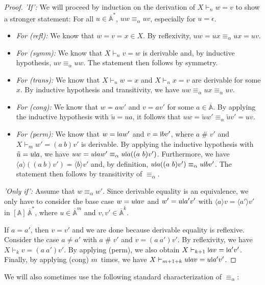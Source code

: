 \documentclass[11pt,a4paper]{amsart}
\newcommand{\Names}{\mathbb{A}}
\newcommand{\barNames}{\overline{\Names}}
\newcommand{\alphaeq}{\equiv_\alpha}
\newcommand{\fresh}{\mathbin{\#}}
\newcommand{\bind}[1]{\langle #1\rangle}
\theoremstyle{plain}
\newcommand{\midmid}{\hspace{0.2ex}{\rule[-0.1ex]{0.6pt}{1.65ex}}\hspace{0.2ex}}
\newcommand{\newletter}[1]{{\midmid}#1}
\numberwithin{equation}{section}
\newcommand{\+}[1]{\mathcal{#1}\xspace}
\theoremstyle{definition}
\begin{document}
\begin{proof}
  \emph{'If':}
  We will proceed by induction on the derivation of \(X \vdash_n w = v\) to show a stronger statement:
  For all \(u\in \barNames^*\), \(uw \alphaeq uv\), especially for \(u = \epsilon\).
  \begin{itemize}
  \item \emph{For (refl):}
    We know that \(w = v = x \in X\).
    By reflexivity, \(uw = ux \alphaeq ux = uv\).
  \item \emph{For (symm):}
    We know that \(X \vdash_n v = w\) is derivable and, by inductive hypothesis, \(uv \alphaeq uw\).
    The statement then follows by symmetry.
  \item \emph{For (trans):}
    We know that \(X \vdash_n w = x\) and \(X \vdash_n x = v\) are derivable for some \(x\).
    By inductive hypothesis and transitivity, we have \(uw \alphaeq ux \alphaeq uv\).
  \item \emph{For (cong):}
    We know that \(w = aw'\) and \(v = av'\) for some \(a\in \barNames\).
    By applying the inductive hypothesis with \(\tilde{u} = ua\), it follows that \(uw = \tilde{u}w' \alphaeq \tilde{u}v' = uv\).
  \item \emph{For (perm):}
    We know that \(w = \newletter{a}w'\) and \(v = \newletter{b}v'\), where \(a \fresh v'\) and \(X \vdash_{m} w' = (a\ b)v'\) is derivable.
    By applying the inductive hypothesis with \(\tilde{u} = u\newletter{a}\), we have \(uw = u\newletter{a}w' \alphaeq u\newletter{a}((a\ b)v')\).
    Furthermore, we have \(\bind{a}((a\ b)v') = \bind{b}v'\) and, by definition, \(u\newletter{a}((a\ b)v') \alphaeq u\newletter{b}v'\).
    The statement then follows by transitivity of \(\alphaeq\).
  \end{itemize}

  \noindent\emph{'Only if':}
  Assume that \(w \alphaeq w'\). Since derivable equality is an equivalence, we only have to consider the base case \(w = u\newletter{a}v\) and \(w' = u\newletter{a'}v'\) with \(\bind{a}v = \bind{a'}v'\) in \([\Names]\,\barNames^*\), where \(u\in \barNames^m\) and \(v, v' \in \barNames^k\).

  If \(a = a'\), then \(v = v'\) and we are done because derivable equality is reflexive.
  Consider the case \(a \neq a'\) with \(a\fresh v'\) and \(v = (a\ a')v'\).
  By reflexivity, we have \(X \vdash_k v = (a\ a')v'\).
  By applying (perm), we also obtain \(X \vdash_{k + 1} \newletter{a}v = \newletter{a'}v'\).
  Finally, by applying (cong) $m$~times, we have \(X \vdash_{m + 1 + k} u\newletter{a}v = u\newletter{a'}v'\).
\end{proof}
We will also sometimes use the following standard characterization of \(\alphaeq\):
\end{document}

